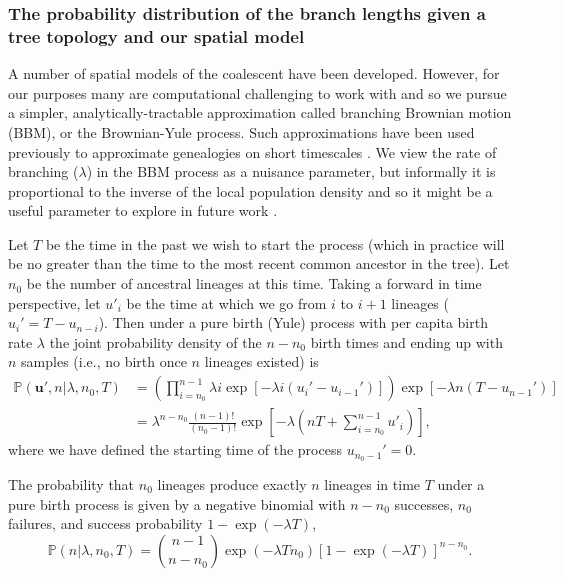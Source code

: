 \documentclass[12pt]{article}
\begin{document}
\subsubsection*{The probability distribution of the branch lengths given a tree topology and our spatial model}

A number of spatial models of the coalescent have been developed. 
However, for our purposes many are computational challenging to work with and so we pursue a simpler, analytically-tractable approximation called branching Brownian motion (BBM), or the Brownian-Yule process. 
Such approximations have been used previously to approximate genealogies on short timescales \citep{edwards1970estimation,rannala1996probability,meligkotsidou2007postprocessing}. 
We view the rate of branching ($\lambda$) in the BBM process as a nuisance parameter, but informally it is proportional to the inverse of the local population density and so it might be a useful parameter to explore in future work \citep[for a recent application see][]{ringbauer2017inferring}.

Let $T$ be the time in the past we wish to start the process (which in practice will be no greater than the time to the most recent common ancestor in the tree).
Let $n_0$ be the number of ancestral lineages at this time.
Taking a forward in time perspective, let $u'_i$ be the time at which we go from $i$ to $i+1$ lineages ($u_i' = T - u_{n - i}$).
Then under a pure birth (Yule) process with per capita birth rate $\lambda$ the joint probability density of the $n-n_0$ birth times and ending up with $n$ samples (i.e., no birth once $n$ lineages existed) is 
%
\begin{equation}\label{eq:fun}
\begin{aligned}
  \mathbb{P}(\mathbf{u}', n | \lambda, n_0, T) &=  \left( \prod_{i=n_0}^{n-1} \lambda i \exp[-\lambda i (u_i' - u_{i-1}')] \right)   \exp[-\lambda n (T - u_{n-1}')] \\
& = \lambda^{n-n_0} \frac{(n-1)!}{(n_0-1)!} \exp \left[-\lambda \left( n T + \sum_{i=n_0}^{n-1}u'_i \right) \right],
\end{aligned}
\end{equation}
%
where we have defined the starting time of the process $u_{n_0-1}' = 0$. 

The probability that $n_0$ lineages produce exactly $n$ lineages in time $T$ under a pure birth process is given by a negative binomial with $n-n_0$ successes, $n_0$ failures, and success probability $1 - \exp(-\lambda T)$,
%
\begin{equation}\label{eq:pn}
\mathbb{P}(n|\lambda,n_0,T) = \binom{n-1}{n-n_0} \exp(-\lambda T n_0) [1-\exp(-\lambda T)]^{n-n_0}.
\end{equation}
%
\end{document}
